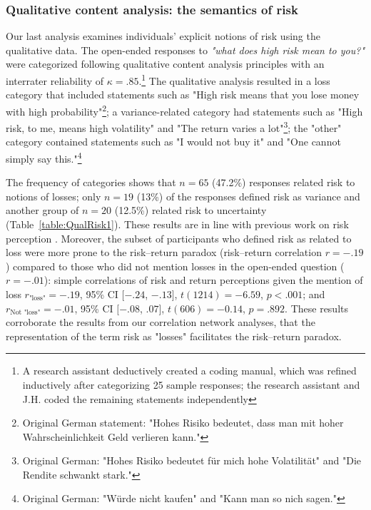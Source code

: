 \documentclass[a4paper,man, natbib,floatsintext]{apa6} %
\begin{document}
\subsubsection{Qualitative content analysis: the semantics of risk}
Our last analysis examines individuals' explicit notions of risk using the qualitative data. The open-ended responses to \textit{"what does high risk mean to you?"} were categorized following qualitative content analysis principles \citep{Mayring2014} with an interrater reliability of $\kappa = .85$.\footnote{A research assistant deductively created a coding manual, which was refined inductively after categorizing 25 sample responses; the research assistant and J.H. coded the remaining statements independently} The qualitative analysis resulted in a loss category that included statements such as "High risk means that you lose money with high probability"\footnote{Original German statement: "Hohes Risiko bedeutet, dass man mit hoher Wahrscheinlichkeit Geld verlieren kann."}; a variance-related category had statements such as "High risk, to me, means high volatility" and "The return varies a lot"\footnote{Original German: "Hohes Risiko bedeutet für mich hohe Volatilität" and "Die Rendite schwankt stark."}; the "other" category contained statements such as "I would not buy it" and "One cannot simply say this."\footnote{Original German: "Würde nicht kaufen" and "Kann man so nich sagen."}

The frequency of categories shows that $n=65$ (47.2\%) responses related risk to notions of losses; only $n=
19$ (13\%) of the responses defined risk as variance and another group of $n=20$ (12.5\%) related risk to uncertainty (Table~\ref{table:QualRisk1}). These results are in line with previous work on risk perception \citep[e.g.,][]{Mohr2010, Duxbury2004}. Moreover, the subset of participants who defined risk as related to loss were more prone to the risk--return paradox (risk--return correlation $r=-.19$) compared to those who did not mention losses in the open-ended question ($r=-.01$): simple correlations of risk and return perceptions given the mention of loss $r_{\text{"loss"}} = -.19$, 95\% CI $[-.24$, $-.13]$, $t(1214) = -6.59$, $p < .001$; and $r_{\text{Not "loss"}} = -.01$, 95\% CI $[-.08$, $.07]$, $t(606) = -0.14$, $p = .892$. These results corroborate the results from our correlation network analyses, that the representation of the term risk as "losses" facilitates the risk--return paradox.
\end{document}
